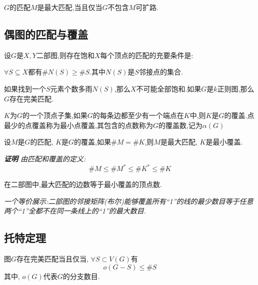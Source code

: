 \begin{theorem}[Berge]
    $G$的匹配$M$是最大匹配,当且仅当$G$不包含$M$可扩路.
\end{theorem}

\subsection{偶图的匹配与覆盖}

\begin{theorem}[Hall定理]
设$G$是$X,Y$二部图,则存在饱和$X$每个顶点的匹配的充要条件是:

$\forall S \subseteq X$都有$\#N(S) \ge \#S$.其中$N(S)$是$S$邻接点的集合.
\end{theorem}

如果找到一个$S$元素个数多雨$N(S)$,那么$X$不可能全部饱和.如果$G$是$k$正则图,那么$G$存在完美匹配.

\begin{definition}[点覆盖]
$K$为$G$的一个顶点子集,如果$G$的每条边都至少有一个端点在$K$中,则$K$是$G$的覆盖.点最少的点覆盖称为最小点覆盖,其包含的点数称为$G$的覆盖数,记为$\alpha(G)$
\end{definition}

\begin{theorem}
设$M$是$G$的匹配, $K$是$G$的覆盖,如果$\#M = \#K$,则$M$是最大匹配, $K$是最小覆盖.
\end{theorem}

\textit{\textbf{证明} \hspace{1em} 由匹配和覆盖的定义:
\begin{equation*}
    \#M \le \#M^* \le \#K^* \le \#K
\end{equation*}
}

\begin{theorem}[K\"{o}nig]
在二部图中,最大匹配的边数等于最小覆盖的顶点数.
\end{theorem}
\textit{一个等价展示:二部图的邻接矩阵(布尔)能够覆盖所有``1''的线的最少数目等于任意两个``1''全都不在同一条线上的``1''的最大数目.
}

\subsection{托特定理}

\begin{theorem}
图$G$存在完美匹配当且仅当, $\forall S \subset V(G)$有
\begin{equation*}
    o(G-S) \le \#S
\end{equation*}
其中, $o(G)$代表$G$的分支数目.
\end{theorem}

